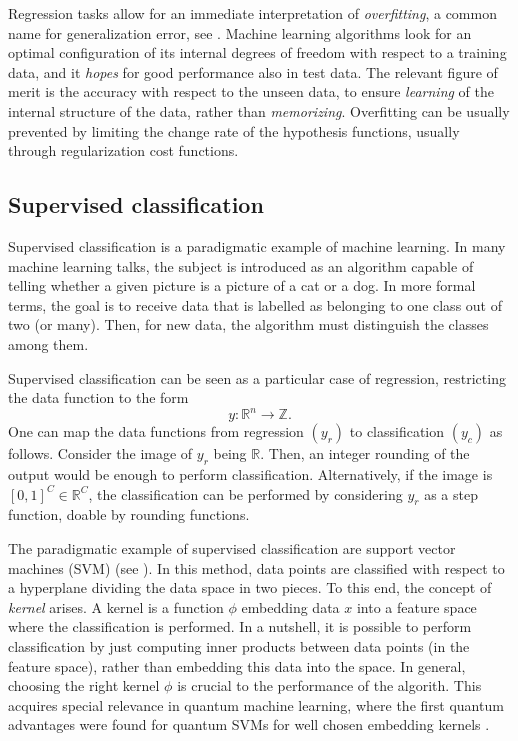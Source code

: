 \documentclass[]{report}
\begin{document}
Regression tasks allow for an immediate interpretation of \textit{overfitting}, a common name for generalization error, see . Machine learning algorithms look for an optimal configuration of its internal degrees of freedom with respect to a training data, and it \textit{hopes} for good performance also in test data. The relevant figure of merit is the accuracy with respect to the unseen data, to ensure \textit{learning} of the internal structure of the data, rather than \textit{memorizing}. Overfitting can be usually prevented by limiting the change rate of the hypothesis functions, usually through regularization cost functions. 


\subsection{Supervised classification}\label{sec.classification}

Supervised classification is a paradigmatic example of machine learning. In many machine learning talks, the subject is introduced as an algorithm capable of telling whether a given picture is a picture of a cat or a dog. In more formal terms, the goal is to receive data that is labelled as belonging to one class out of two (or many). Then, for new data, the algorithm must distinguish the classes among them. 

Supervised classification can be seen as a particular case of regression, restricting the data function to the form
\begin{equation}
y: \mathbb R^n \rightarrow \mathbb Z. 
\end{equation}
One can map the data functions from regression $(y_r)$ to classification $(y_c)$ as follows. Consider the image of $y_r$ being $\mathbb R$. Then, an integer rounding of the output would be enough to perform classification. Alternatively, if the image is $[0, 1]^C \in \mathbb R^C$, the classification can be performed by considering $y_r$ as a step function, doable by rounding functions. 

The paradigmatic example of supervised classification are support vector machines (SVM) (see ). In this method, data points are classified with respect to a hyperplane dividing the data space in two pieces. To this end, the concept of \textit{kernel} arises. A kernel is a function $\phi$ embedding data $x$ into a feature space where the classification is performed. In a nutshell, it is possible to perform classification by just computing inner products between data points (in the feature space), rather than embedding this data into the space. In general, choosing the right kernel $\phi$ is crucial to the performance of the algorith. This acquires special relevance in quantum machine learning, where the first quantum advantages were found for quantum SVMs for well chosen embedding kernels \cite{liu2021rigorous}.
\end{document}
